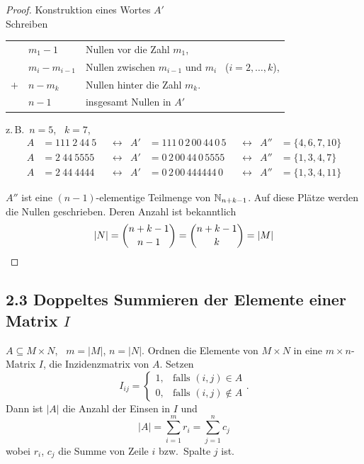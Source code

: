 \begin{proof}
Konstruktion eines Wortes $A'$\\
Schreiben
\begin{center}
\begin{tabular}{rll}
 & $m_1 - 1$ & Nullen vor die Zahl $m_1$, \\
 & $m_i - m_{i-1}$ & Nullen zwischen $m_{i-1}$ und $m_i$ \ ($i = 2, \dots, k$), \\
$+$ & $n - m_k$ & Nullen hinter die Zahl $m_k$. \\
\midrule
 & $n - 1$ & insgesamt Nullen in $A'$ \\
\end{tabular}
\end{center}

z.\,B.\ \quad $n = 5$, \ $k = 7$,
\begin{align*}
A &= 111\ 2\ 44\ 5 & &\leftrightarrow & A' &= 111\,0\,2\,00\,44\,0\,5 & &\leftrightarrow & A'' &= \{4, 6, 7, 10\}\\
A &= 2\ 44\ 5555 & &\leftrightarrow & A' &= 0\,2\,00\,44\,0\,5555 & &\leftrightarrow & A'' &= \{1, 3, 4, 7\}\\
A &= 2\ 44\ 4444 & &\leftrightarrow & A' &= 0\,2\,00\,444444\,0 & &\leftrightarrow & A'' &= \{1, 3, 4, 11\}
\end{align*}

$A''$ ist eine $(n-1)$-elementige Teilmenge von $\mathbb{N}_{n+k-1}$. Auf diese Plätze werden die Nullen geschrieben. Deren Anzahl ist bekanntlich
\[
|N| = \binom{n+k-1}{n-1} = \binom{n+k-1}{k} = |M| \qedhere
\]
\end{proof}

\subsection{2.3 Doppeltes Summieren der Elemente einer Matrix $I$}

$A \subseteq M \times N$, \ $m = |M|$, $n = |N|$. Ordnen die Elemente von $M \times N$ in eine $m\times n$-Matrix $I$, die Inzidenzmatrix von $A$. Setzen
\[
I_{ij} = \begin{cases} 1, & \text{falls } (i,j) \in A \\ 0, & \text{falls } (i,j) \notin A \end{cases}.
\]
Dann ist $|A|$ die Anzahl der Einsen in $I$ und
\[
|A| = \sum_{i=1}^{m} r_i = \sum_{j=1}^{n} c_j
\]
wobei $r_i$, $c_j$ die Summe von Zeile $i$ bzw.\ Spalte $j$ ist.

